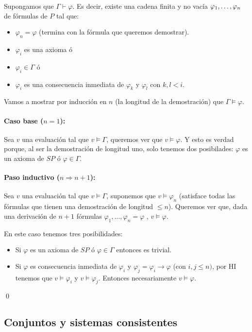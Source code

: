 \begin{demo}
	Supongamos que $\Gamma\vdash\varphi$. Es decir, existe una cadena finita y no vacía $\varphi_1,\dots, \varphi_{n}$ de fórmulas de $P$ tal que:
\begin{itemize}
	\item $\varphi_n = \varphi$ (termina con la fórmula que queremos demostrar).
	\item $\varphi_i$ es una axioma ó
	\item $\varphi_i\in\Gamma$ ó
	\item $\varphi_i$ es una consecuencia inmediata de $\varphi_k$ y $\varphi_l$ con $k,l < i$.
\end{itemize}

Vamos a mostrar por inducción en $n$ (la longitud de la demostración) que $\Gamma\vDash\varphi$.

\paragraph{Caso base ($n = 1$):} Sea $v$ una evaluación tal que $v\vDash\Gamma$, queremos ver que $v\vDash\varphi$. Y esto es verdad porque, al ser la demostración de longitud uno, solo tenemos dos posibilades: $\varphi$ es un axioma de $SP$ ó $\varphi\in\Gamma$.

\paragraph{Paso inductivo ($n \Rightarrow n+1$):} Sea $v$ una evaluación tal que $v\vDash\Gamma$, suponemos que $v\vDash\varphi_n$ (satisface todas las fórmulas que tienen una demostración de longitud $\leq n$). Queremos ver que, dada una derivación de $n+1$ fórmulas $\varphi_1,\dots,\varphi_n = \varphi$ , $v\vDash\varphi$.

En este caso tenemos tres posibilidades:
\begin{itemize}
	\item Si $\varphi$ es un axioma de $SP$ ó $\varphi\in\Gamma$ entonces es trivial.
	\item Si $\varphi$ es consecuencia inmediata de $\varphi_i$ y $\varphi_j = \varphi_i \rightarrow \varphi$ (con $i,j\leq n)$, por HI tenemos que $v\vDash\varphi_i$ y $v\vDash\varphi_j$. Entonces necesariamente $v\vDash\varphi$.
\end{itemize}\qed
\end{demo}

\subsection{Conjuntos y sistemas consistentes}

